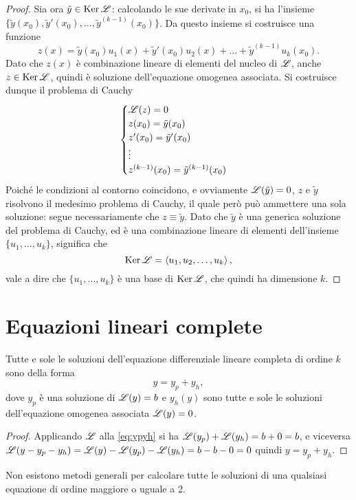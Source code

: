 \begin{proof}
Sia ora $\tilde{y}\in\operatorname{Ker}\mathscr L$: calcolando le sue derivate in $x_0$, si ha l'insieme $\{\tilde{y}(x_0),\tilde{y}'(x_0),\dots,\tilde{y}^{(k-1)}(x_0)\}$. Da questo insieme si costruisce una funzione
\[
z(x)=\tilde{y}(x_0)u_1(x)+\tilde{y}'(x_0)u_2(x)+\dots+\tilde{y}^{(k-1)}u_k(x_0).
\]
Dato che $z(x)$ è combinazione lineare di elementi del nucleo di $\mathscr L$, anche $z\in\operatorname{Ker}\mathscr L$, quindi è soluzione dell'equazione omogenea associata. Si costruisce dunque il problema di Cauchy
\[
\begin{cases}
\mathscr L(z)=0\\z(x_0)=\tilde{y}(x_0)\\z'(x_0)=\tilde{y}'(x_0)\\\vdots\\z^{(k-1)}(x_0)=\tilde{y}^{(k-1)}(x_0)
\end{cases}
\]
Poiché le condizioni al contorno coincidono, e ovviamente $\mathscr L(\tilde{y})=0$, $z$ e $\tilde{y}$ risolvono il medesimo problema di Cauchy, il quale però può ammettere una sola soluzione: segue necessariamente che $z\equiv\tilde{y}$. Dato che $\tilde{y}$ è una generica soluzione del problema di Cauchy, ed è una combinazione lineare di elementi dell'insieme $\{u_1,\dots,u_k\}$, significa che
\[
\operatorname{Ker}\mathscr L=\left\langle{u_1,u_2,\dots,u_k}\right\rangle,
\]
vale a dire che $\{u_1,\dots,u_k\}$ è una base di $\operatorname{Ker}\mathscr L$, che quindi ha dimensione $k$.
\end{proof}

\section{Equazioni lineari complete}
\begin{teorema}
Tutte e sole le soluzioni dell'equazione differenziale lineare completa di ordine $k$ sono della forma
\begin{equation} \label{eq:ypyh}
y=y_p+y_h,
\end{equation}
dove $y_p$ è una soluzione di $\mathscr L(y)=b$ e $y_h(y)$ sono tutte e sole le soluzioni dell'equazione omogenea associata $\mathscr L(y)=0$.
\end{teorema}
\begin{proof}
Applicando $\mathscr L$ alla \eqref{eq:ypyh} si ha $\mathscr L(y_p)+\mathscr L(y_h)=b+0=b$, e viceversa $\mathscr L(y-y_p-y_h)=\mathscr L(y)-\mathscr L(y_p)-\mathscr L(y_h)=b-b-0=0$ quindi $y=y_p+y_h$.
\end{proof}
Non esistono metodi generali per calcolare tutte le soluzioni di una qualsiasi equazione di ordine maggiore o uguale a 2.

